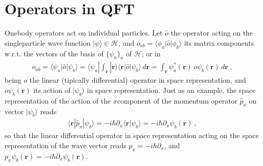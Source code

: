 \documentclass[letterpaper,10pt,english]{jupyterBook}
\begin{document}
\section{Operators in QFT}
\label{\detokenize{ch/quantum-mechanics/many-body/operators:operators-in-qft}}\label{\detokenize{ch/quantum-mechanics/many-body/operators:quantum-mechanics-second-quantizazion-operators}}\label{\detokenize{ch/quantum-mechanics/many-body/operators::doc}}
\sphinxAtStartPar
One\sphinxhyphen{}body operators act on individual particles. Let \(\hat{o}\) the operator acting on the single\sphinxhyphen{}particle wave function \(| \psi \rangle \in \mathcal{H}\), and \(o_{ab} = \langle \phi_a | \hat{o} | \phi_b \rangle\) its matrix components w.r.t. the vectors of the basis of \(\{ \psi_a \}_a\) of \(\mathcal{H}\), or in 
\begin{equation*}
\begin{split}
o_{ab} = \langle \psi_a | \hat{o} | \psi_b \rangle = \langle \psi_a |\int_{\mathbf{r}} | \mathbf{r} \rangle \langle \mathbf{r} | \hat{o} | \psi_b \rangle \, d \mathbf{r} = \int_{\mathbf{r}} \psi_a^*(\mathbf{r}) \, o \psi_b(\mathbf{r}) \, d \mathbf{r} \ ,
\end{split}
\end{equation*}
\sphinxAtStartPar
being \(o\) the linear (tipically differential) operator in space representation, and \(o \psi_b(\mathbf{r})\) its action of \(| \psi_b \rangle\) in space representation. Just as an example, the space representation of the action of the \(x\)\sphinxhyphen{}component of the momentum operator \(\hat{p}_x\) on vector \(| \psi_b \rangle\) reads
\begin{equation*}
\begin{split}\langle \mathbf{r} | \hat{p}_x | \psi_b \rangle = -i \hbar \partial_x \langle \mathbf{r} | \psi_b \rangle = - i \hbar \partial_x \psi_b(\mathbf{r}) \ ,\end{split}
\end{equation*}
\sphinxAtStartPar
so that the linear differential operator in space representation acting on the space representation of the wave vector reads \(p_x = - i \hbar \partial_x\), and \(p_x \psi_b(\mathbf{r}) = - i \hbar \partial_x \psi_b(\mathbf{r})\).
\end{document}
